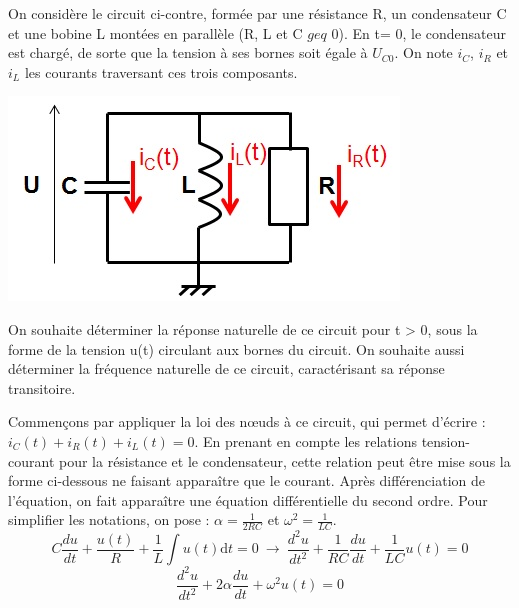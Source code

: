 \documentclass[]{report}
\newcommand{\deriv}{\mathrm{d}}
\begin{document}
	\begin{minipage}[l]{0.7\linewidth}
		On considère le circuit ci-contre, formée par une résistance R, un condensateur C et une bobine L montées en parallèle (R, L et C $geq$ 0). En t= 0, le condensateur est chargé, de sorte que la tension à ses bornes soit égale à $U_{C0}$. On note $i_{C}$, $i_{R}$ et $i_{L}$ les courants traversant ces trois composants. 	
	\end{minipage} \hfill
	\begin{minipage}[r]{0.4\linewidth}
		\includegraphics[scale=0.5]{images/circuit_RLC_reponse_naturelle.jpg} 	
	\end{minipage}
	\vspace{0.5\baselineskip}
	On souhaite déterminer la réponse naturelle de ce circuit pour t > 0, sous la forme de la tension u(t) circulant aux bornes du circuit. On souhaite aussi déterminer la fréquence naturelle de ce circuit, caractérisant sa réponse transitoire.

	\vspace{1\baselineskip}
	Commençons par appliquer la loi des nœuds à ce circuit, qui permet d'écrire : $i_{C}(t)+i_{R}(t)+i_{L}(t)=0.$ En prenant en compte les relations tension-courant pour la résistance et le condensateur, cette relation peut être mise sous la forme ci-dessous ne faisant apparaître que le courant. Après différenciation de l'équation, on fait apparaître une équation différentielle du second ordre. Pour simplifier les notations, on pose : $\alpha = \frac{1}{2RC} $ et $\omega^{2} = \frac{1}{LC}$.
	\begin{equation*}
	C\frac{du}{dt}+\frac{u(t)}{R}+\frac{1}{L}\int u(t) \deriv t=0~\rightarrow ~\frac{d^{2}u}{dt^{2}}+\frac{1}{RC}\frac{du}{dt}+\frac{1}{LC}u(t) = 0
	\end{equation*}
	\begin{equation*}
	\frac{d^{2}u}{dt^{2}}+2\alpha \frac{du}{dt}+\omega^{2}u(t) = 0
	\end{equation*}
	
\end{document}
